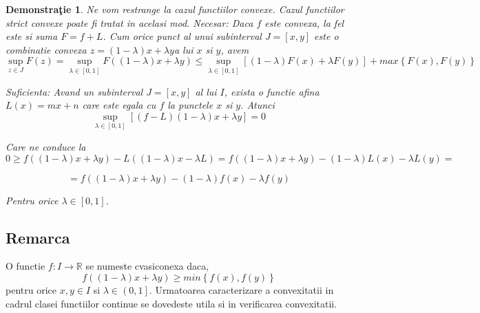 \documentclass[a4paper,12pt,oneside]{report}
\newtheorem{demonstration}{Demonstra\c tie}
\begin{document}
\begin{demonstration}
Ne vom restrange la cazul functiilor convexe. Cazul functiilor strict convexe poate fi tratat in acelasi mod. 
Necesar: Daca \(f\) este convexa, la fel este si suma \(F = f + L\). Cum orice punct al unui subinterval \(J = \left [ x , y \right ]\) este o combinatie convexa \(z = \left ( 1 - \lambda  \right )x + \lambda y \)a lui \(x\) si \(y\), avem
\begin{displaymath}
  \sup_{z\in J}F\left ( z \right ) = \sup_{\lambda \in \left [ 0 , 1 \right ]}F\left ( \left ( 1 - \lambda  \right )x + \lambda y \right )\leq \sup_{\lambda \in \left [ 0,1 \right ]}\left [ \left ( 1-\lambda  \right )F\left ( x \right ) + \lambda F\left ( y \right ) \right ] + max \left \{ F\left ( x \right ), F\left ( y \right ) \right \}
\end{displaymath}

Suficienta: Avand un subinterval \(J = \left [ x,y \right ]\) al lui \(I\), exista o functie afina \(L\left ( x \right ) = mx + n\) care este egala cu \(f\) la punctele  \(x\) si \(y\). 
Atunci
\begin{displaymath}
  \sup_{\lambda \in \left [ 0,1 \right ]}\left [ \left ( f - L \right )\left ( 1 - \lambda  \right )x + \lambda y \right ] = 0
\end{displaymath}

Care ne conduce la 
\begin{displaymath}
  0\geq f\left ( \left ( 1 - \lambda  \right )x + \lambda y \right )- L\left ( \left ( 1 - \lambda  \right )x - \lambda L \right )= f\left ( \left ( 1 - \lambda  \right )x + \lambda y  \right ) - \left ( 1 - \lambda  \right )L\left ( x \right ) - \lambda L\left ( y \right ) =
\end{displaymath}

\begin{displaymath}
  = f\left ( \left ( 1 - \lambda  \right )x + \lambda y \right ) - \left ( 1 - \lambda  \right ) f\left ( x \right ) - \lambda f \left ( y \right )
\end{displaymath}


Pentru orice \(\lambda \in \left [ 0,1 \right ]\). 

\end{demonstration}

\subsection{Remarca}

O functie \(f: I \rightarrow \mathbb{R}\) se numeste cvasiconexa daca,
 \begin{displaymath}
  f\left ( \left ( 1-\lambda  \right )x + \lambda y \right )\geq  min\left \{ f\left ( x \right ), f\left ( y \right ) \right \}
\end{displaymath}
pentru orice  \(x, y \in I\) si \(\lambda  \in \left ( 0,1 \right ]\).
	 Urmatoarea caracterizare a convexitatii in cadrul clasei functiilor continue se dovedeste utila si in verificarea convexitatii. 
\end{document}
